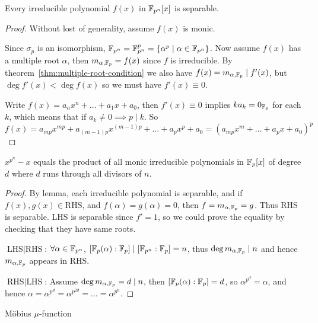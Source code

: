 \begin{lemma}
  Every irreducible polynomial $f(x)$ in $\mathbb{F}_{p^n}[x]$ is separable.

  \begin{proof}
    Without lost of generality, assume $f(x)$ is monic.

    Since $\sigma_p$ is an isomorphism, $\mathbb{F}_{p^n} = \mathbb{F}_{p^n}^p = \{ \alpha^p \mid \alpha \in \mathbb{F}_{p^n}\}$.
    Now assume $f(x)$ has a multiple root $\alpha$, then $m_{\alpha, \mathbb{F}_p} = f(x)$ since $f$
    is irreducible. By theorem~\ref{thm:multiple-root-condition} we also have
    $f(x) = m_{\alpha, \mathbb{F}_p} \mid f'(x)$, but $\deg f'(x) < \deg f(x)$ so we must have $f'(x) \equiv 0$.

    Write $f(x) = a_n x^n + \ldots + a_1 x + a_0$, then $f'(x) \equiv 0$ implies $k a_k = 0_{\mathbb{F}_p}$ for each $k$,
    which means that if $a_k \neq 0 \implies p \mid k$. So
    \[ f(x) = a_{mp} x^{mp} + a_{(m-1)p} x^{(m-1)p} + \ldots + a_p x^p + a_0 = (a_{mp} x^m + \ldots + a_p x + a_0)^p \]
  \end{proof}
\end{lemma}

\begin{theorem}
  $x^{p^n} - x$ equals the product of all monic irreducible polynomials in $\mathbb{F}_p[x]$ of degree $d$ where
  $d$ runs through all divisors of $n$.

  \begin{proof}
    By lemma, each irreducible polynomial is separable, and if $f(x), g(x) \in \text{RHS}$,
    and $f(\alpha) = g(\alpha) = 0$, then $f = m_{\alpha, \mathbb{F}_p} = g$. Thus RHS is separable.
    LHS is separable since $f' = 1$, so we could prove the equality by checking that
    they have same roots.

    $\text{LHS} \mid \text{RHS}$: $\forall \alpha \in \mathbb{F}_{p^n}$, $[\mathbb{F}_p(\alpha): \mathbb{F}_p] \mid [\mathbb{F}_{p^n}: \mathbb{F}_p] = n$,
    thus $\deg m_{\alpha, \mathbb{F}_p} \mid n$ and hence $m_{\alpha, \mathbb{F}_p}$ appears in RHS.

    $\text{RHS} \mid \text{LHS}$: Assume $\deg m_{\alpha, \mathbb{F}_p} = d \mid n$, then
    $[\mathbb{F}_p(\alpha): \mathbb{F}_p] = d$, so $\alpha^{p^d} = \alpha$, and hence
    $\alpha = \alpha^{p^d} = \alpha^{p^{2d}} = \dots = \alpha^{p^n}$.
  \end{proof}
\end{theorem}

\begin{definition}
  M\"{o}bius $\mu$-function
\end{definition}
